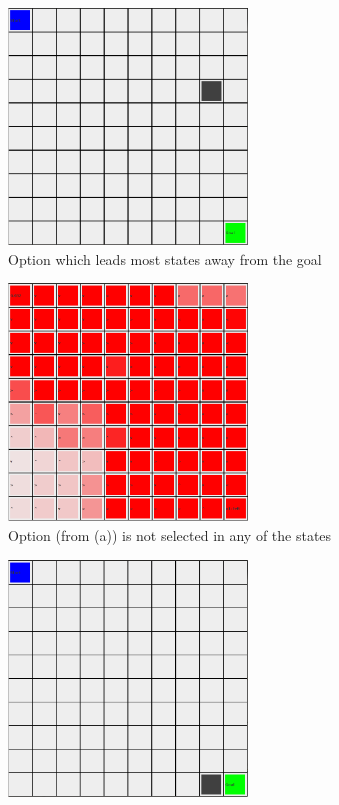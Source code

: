 \documentclass{acm_proc_article-sp}
\begin{document}
\begin{figure}[!htbp]
  \begin{subfigure}[h]{.5\textwidth}
  	\centering
    \includegraphics[width=2.5in]{GiantOp1.png}
    \caption{Option which leads most states away from the goal}
  \end{subfigure}\hfill
  \begin{subfigure}[h]{.5\textwidth}
  \centering
    \includegraphics[width=2.5in]{GiantOption1Pol.png}
    \caption{Option (from (a)) is not selected in any of the states}
  \end{subfigure}
  \hfill
  \begin{subfigure}[h]{.5\textwidth}
  \centering
    \includegraphics[width=2.5in]{GiantOp2.png}

\end{subfigure}
\end{figure}
\end{document}

